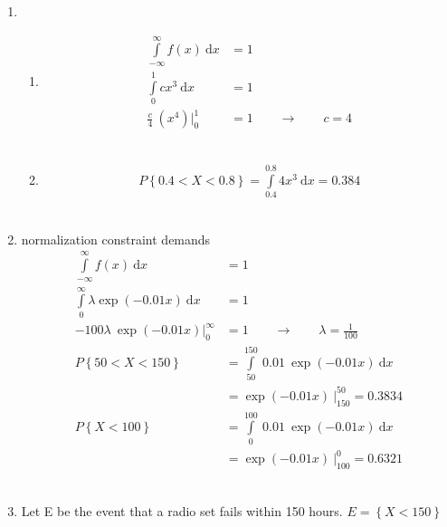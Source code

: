 \begin{enumerate}
\begin{enumerate}
	\end{enumerate}
	
	\item 
	
		\begin{enumerate}
			\item \begin{align}
				\int\limits_{-\infty}^{\infty} f(x)\ \mathrm{d}x &= 1 \nonumber \\
				\int\limits_{0}^{1} c x^3\ \mathrm{d}x &= 1 \nonumber\\
				\frac{c}{4}\ (x^4) \Big|_0^1 &= 1 \qquad \to \qquad c = 4
			\end{align} \\
			
			\item \begin{align}
				P \left\{0.4 < X < 0.8 \right\} = \int\limits_{0.4}^{0.8} 4 x^3\ \mathrm{d}x = 0.384
			\end{align}\\
		\end{enumerate}
	
	
	\item normalization constraint demands \\
	
		\begin{align}
			\int\limits_{-\infty}^{\infty} f(x)\ \mathrm{d}x &= 1 \nonumber \\
			\int\limits_{0}^{\infty} \lambda \exp(-0.01x)\ \mathrm{d}x &= 1 \nonumber\\
			-100 \lambda \ \exp(-0.01x) \Big|_0^\infty &= 1 \qquad \to \qquad \lambda = \frac{1}{100} \\
			P \left\{50 < X < 150 \right\} &= \int\limits_{50}^{150}\ 0.01\ \exp(-0.01x)\ \mathrm{d}x \nonumber \\
			&= \exp(-0.01x)\ \Big|_{150}^{50} = 0.3834 \\
			P \left\{X < 100 \right\} &= \int\limits_{0}^{100}\ 0.01\ \exp(-0.01x)\ \mathrm{d}x \nonumber \\
			&= \exp(-0.01x)\ \Big|_{100}^{0} = 0.6321
		\end{align}\\
	
	
	\item Let E be the event that a radio set fails within 150 hours. $ E = \left\{ X < 150 \right\} $ \\
	

\end{enumerate}
